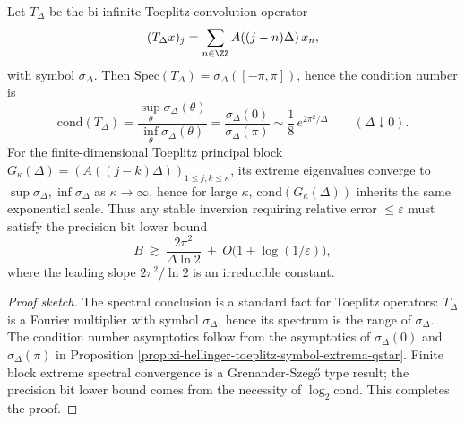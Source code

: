 \begin{proposition}\label{prop:xi-hellinger-toeplitz-conditioning-exponential-law}
Let \(T_\Delta\) be the bi-infinite Toeplitz convolution operator
\[
(T_\Delta x)_j=\sum_{n\in\ZZ}A((j-n)\Delta)\,x_n,
\]
with symbol \(\sigma_\Delta\).
Then \(\mathrm{Spec}(T_\Delta)=\sigma_\Delta([-\pi,\pi])\), hence the condition number is
\[
\mathrm{cond}(T_\Delta)=\frac{\sup_\theta\sigma_\Delta(\theta)}{\inf_\theta\sigma_\Delta(\theta)}
=\frac{\sigma_\Delta(0)}{\sigma_\Delta(\pi)}
\sim \frac18\,e^{2\pi^2/\Delta}\qquad(\Delta\downarrow 0).
\]
For the finite-dimensional Toeplitz principal block \(G_\kappa(\Delta)=(A((j-k)\Delta))_{1\le j,k\le\kappa}\), its extreme eigenvalues converge to \(\sup\sigma_\Delta,\inf\sigma_\Delta\) as \(\kappa\to\infty\), hence for large \(\kappa\), \(\mathrm{cond}(G_\kappa(\Delta))\) inherits the same exponential scale.
Thus any stable inversion requiring relative error \(\le\varepsilon\) must satisfy the precision bit lower bound
\[
B\ \gtrsim\ \frac{2\pi^2}{\Delta\ln 2}\ +\ O\bigl(1+\log(1/\varepsilon)\bigr),
\]
where the leading slope \(2\pi^2/\ln2\) is an irreducible constant.
\end{proposition}
\begin{proof}[Proof sketch]
The spectral conclusion is a standard fact for Toeplitz operators: \(T_\Delta\) is a Fourier multiplier with symbol \(\sigma_\Delta\), hence its spectrum is the range of \(\sigma_\Delta\).
The condition number asymptotics follow from the asymptotics of \(\sigma_\Delta(0)\) and \(\sigma_\Delta(\pi)\) in Proposition \ref{prop:xi-hellinger-toeplitz-symbol-extrema-qstar}.
Finite block extreme spectral convergence is a Grenander-Szeg\H{o} type result; the precision bit lower bound comes from the necessity of \(\log_2\mathrm{cond}\). This completes the proof.
\end{proof}

